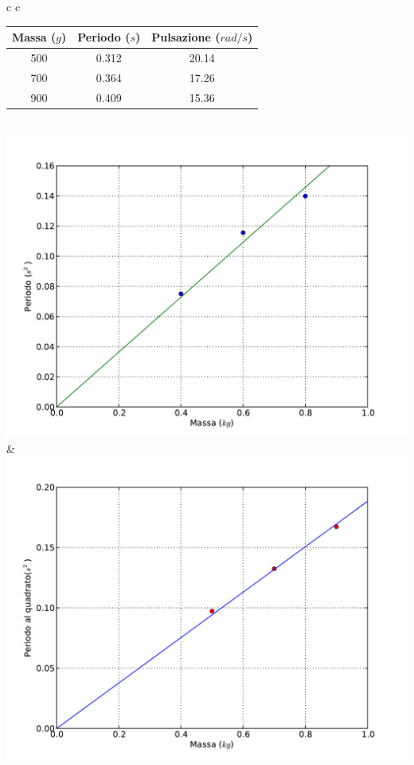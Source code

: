 \begin{center}
\begin{tabular}{c c}
\begin{tabular}{c | c | c}
Massa ($g$) & Periodo ($s$) & Pulsazione ($rad/s$)\\
\midrule
500 & 0.312 & 20.14\\
700 & 0.364 & 17.26\\
900 & 0.409 & 15.36\\
\end{tabular}
\\
\includegraphics[scale=0.4]{../grafici/molla/mollaA.pdf}& \hspace{1cm}
\includegraphics[scale=0.4]{../grafici/molla/mollaB.pdf}\\
\end{tabular}

\end{center}

